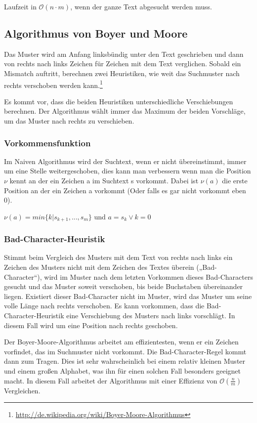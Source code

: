 Laufzeit in \(\mathcal{O}(n\cdot m)\), wenn der ganze Text abgesucht werden muss.

\subsection{Algorithmus von Boyer und Moore}
Das Muster wird am Anfang linksbündig unter den Text geschrieben und dann von rechts nach links Zeichen für Zeichen mit dem Text verglichen. Sobald ein Mismatch auftritt, berechnen zwei Heuristiken, wie weit das Suchmuster nach rechts verschoben werden kann.\footnote{\url{http://de.wikipedia.org/wiki/Boyer-Moore-Algorithmus}}

Es kommt vor, dass die beiden Heuristiken unterschiedliche Verschiebungen berechnen. Der Algorithmus wählt immer das Maximum der beiden Vorschläge, um das Muster nach rechts zu verschieben.
\text{}\\


\subsubsection{Vorkommensfunktion}
Im Naiven Algorithmus wird der Suchtext, wenn er nicht übereinstimmt, immer um eine Stelle weitergeschoben, dies kann man verbessern wenn man die Position \(\nu\) kennt an der ein Zeichen a im Suchtext s vorkommt. Dabei ist \(\nu(a)\) die erste Position an der ein Zeichen a vorkommt (Oder falls es gar nicht vorkommt eben 0).

\(\nu(a) = min\{k|s_{k+1},...,s_m\}\) und \(a = s_k \lor k = 0\)

\subsubsection{Bad-Character-Heuristik}
Stimmt beim Vergleich des Musters mit dem Text von rechts nach links ein Zeichen des Musters nicht mit dem Zeichen des Textes überein („Bad-Character“), wird im Muster nach dem letzten Vorkommen dieses Bad-Characters gesucht und das Muster soweit verschoben, bis beide Buchstaben übereinander liegen. Existiert dieser Bad-Character nicht im Muster, wird das Muster um seine volle Länge nach rechts verschoben. Es kann vorkommen, dass die Bad-Character-Heuristik eine Verschiebung des Musters nach links vorschlägt. In diesem Fall wird um eine Position nach rechts geschoben.

Der Boyer-Moore-Algorithmus arbeitet am effizientesten, wenn er ein Zeichen vorfindet, das im Suchmuster nicht vorkommt. Die Bad-Character-Regel kommt dann zum Tragen. Dies ist sehr wahrscheinlich bei einem relativ kleinen Muster und einem großen Alphabet, was ihn für einen solchen Fall besonders geeignet macht. In diesem Fall arbeitet der Algorithmus mit einer Effizienz von \(\mathcal{O}(\frac{n}{m})\) Vergleichen.

